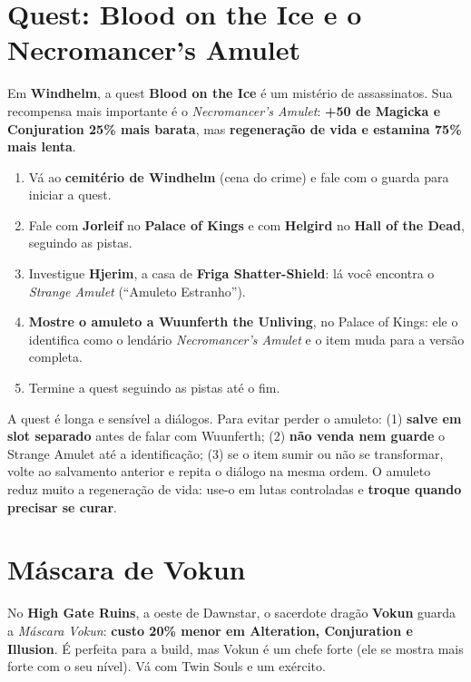 \documentclass[11pt,a4paper,oneside,openany]{book}
\newcommand{\quest}[1]{\textsf{\textbf{\textcolor{NecroEmerald}{#1}}}}
\newcommand{\lugar}[1]{\textbf{\textcolor{ImperialGold!75!black}{#1}}}
\newcommand{\npc}[1]{\textbf{#1}}
\newcommand{\objeto}[1]{\textit{\textcolor{NecroEmerald}{#1}}}
\begin{document}
\section{Quest: Blood on the Ice e o Necromancer's Amulet}
Em \lugar{Windhelm}, a quest \quest{Blood on the Ice} é um mistério de assassinatos. Sua recompensa mais importante é o \objeto{Necromancer's Amulet}: \textbf{+50 de Magicka e Conjuration 25\% mais barata}, mas \textbf{regeneração de vida e estamina 75\% mais lenta}.

\begin{enumerate}
  \item Vá ao \textbf{cemitério de Windhelm} (cena do crime) e fale com o guarda para iniciar a quest.
  \item Fale com \npc{Jorleif} no \lugar{Palace of Kings} e com \npc{Helgird} no \lugar{Hall of the Dead}, seguindo as pistas.
  \item Investigue \lugar{Hjerim}, a casa de \npc{Friga Shatter-Shield}: lá você encontra o \objeto{Strange Amulet} (``Amuleto Estranho'').
  \item \textbf{Mostre o amuleto a \npc{Wuunferth the Unliving}}, no Palace of Kings: ele o identifica como o lendário \objeto{Necromancer's Amulet} e o item muda para a versão completa.
  \item Termine a quest seguindo as pistas até o fim.
\end{enumerate}

\begin{alerta}
A quest é longa e sensível a diálogos. Para evitar perder o amuleto: (1) \textbf{salve em slot separado} antes de falar com Wuunferth; (2) \textbf{não venda nem guarde} o Strange Amulet até a identificação; (3) se o item sumir ou não se transformar, volte ao salvamento anterior e repita o diálogo na mesma ordem. O amuleto reduz muito a regeneração de vida: use-o em lutas controladas e \textbf{troque quando precisar se curar}.
\end{alerta}

\section{Máscara de Vokun}
No \lugar{High Gate Ruins}, a oeste de Dawnstar, o sacerdote dragão \npc{Vokun} guarda a \objeto{Máscara Vokun}: \textbf{custo 20\% menor em Alteration, Conjuration e Illusion}. É perfeita para a build, mas Vokun é um chefe forte (ele se mostra mais forte com o seu nível). Vá com Twin Souls e um exército.
\end{document}

